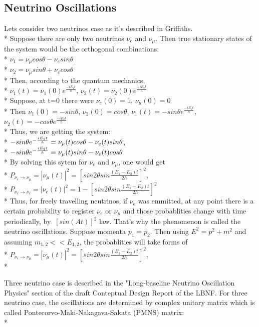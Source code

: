 \subsection{Neutrino Oscillations}
Lets consider two neutrinos case as it's described in Griffiths\cite{ref_Griffiths}.\\*
Suppose there are only two neutrinos $\nu_e$ and $\nu_{\mu}$. Then true stationary states of the system would be the orthogonal combinations:\\*
$\nu_1=\nu_{\mu}cos\theta-\nu_esin\theta$\\*
$\nu_2=\nu_{\mu}sin\theta+\nu_ecos\theta$\\*
Then, according to the quantum mechanics,\\*
$\nu_1(t)=\nu_1(0)e^{\frac{-iE_1t}{h}}$, $\nu_2(t)=\nu_2(0)e^{\frac{-iE_2t}{h}}$\\*
Suppose, at t=0 there were $\nu_e(0)=1$, $\nu_\mu(0)=0$\\*
Then $\nu_1(0)=-sin\theta$, $\nu_2(0)=cos\theta$, $\nu_1(t)=-{sin\theta}e^{\frac{-iE_1t}{h}}$, $\nu_2(t)=-{cos\theta}e^{\frac{-iE_2t}{h}}$\\*
Thus, we are getting the system:\\*
$-{sin\theta}e^{-{{iE_1t} \over h}}=\nu_\mu(t)cos\theta-\nu_e(t)sin\theta$,\\*
$-{sin\theta}e^{-{{iE_2t} \over h}}=\nu_\mu(t)sin\theta-\nu_e(t)cos\theta$\\*
By solving this sytem for $\nu_e$ and $\nu_\mu$, one would get\\*
$P_{\nu_e \rightarrow \nu_\mu}=|\nu_\mu(t)|^2=[{sin2\theta}sin{\frac{(E_1-E_2)t}{2h}}]^2$,\\*
$P_{\nu_e \rightarrow \nu_e}=|\nu_e(t)|^2=1-[{sin2\theta}sin{\frac{(E_1-E_2)t}{2h}}]^2$\\*
Thus, for freely travelling neutrinos, if $\nu_e$ was emmitted, at any point there is a certain probability to register $\nu_e$ or $\nu_\mu$ and those probablities change with time periodically, by $~[sin(At)]^2$ law. That's why the phenomenon is called the neutrino oscillations.
Suppose momenta $p_1=p_2$. Then using $E^2=p^2+m^2$ and assuming $m_{1,2}<<E_{1,2}$, the probablities will take forms of\\*
$P_{\nu_e \rightarrow \nu_\mu}=|\nu_\mu(t)|^2=[{sin2\theta}sin{\frac{(E_1-E_2)t}{2h}}]^2$,\\*  

Three neutrino case is described in the "Long-baseline Neutrino Oscillation Physics" section of the draft Conteptual Design Report of the LBNF. For three neutrino case, the oscillations are determined by complex unitary matrix which is called Pontecorvo-Maki-Nakagava-Sakata (PMNS) matrix:\\*

